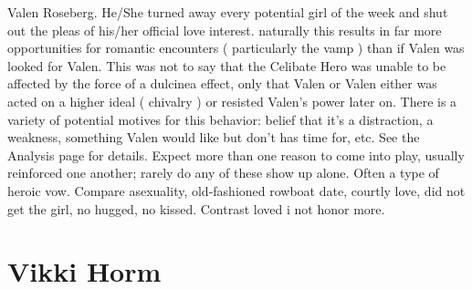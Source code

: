 \documentclass[12pt]{book}
\begin{document}
Valen Roseberg. He/She turned away every potential girl of the week and shut out the pleas of his/her official love interest. naturally this results in far more opportunities for romantic encounters ( particularly the vamp ) than if Valen was looked for Valen. This was not to say that the Celibate Hero was unable to be affected by the force of a dulcinea effect, only that Valen or Valen either was acted on a higher ideal ( chivalry ) or resisted Valen's power later on. There is a variety of potential motives for this behavior: belief that it's a distraction, a weakness, something Valen would like but don't has time for, etc. See the Analysis page for details. Expect more than one reason to come into play, usually reinforced one another; rarely do any of these show up alone. Often a type of heroic vow. Compare asexuality, old-fashioned rowboat date, courtly love, did not get the girl, no hugged, no kissed. Contrast loved i not honor more.



\chapter{Vikki Horm}
\end{document}
